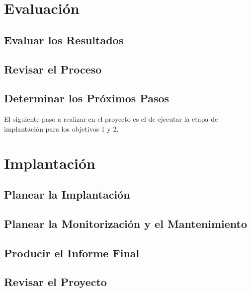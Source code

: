 \documentclass{article}
\begin{document}
\section{Evaluación}
\subsection{Evaluar los Resultados}
\subsection{Revisar el Proceso}
\subsection{Determinar los Próximos Pasos}
El siguiente paso a realizar en el proyecto es el de ejecutar la etapa de implantación para los objetivos 1 y 2.

\section{Implantación}
\subsection{Planear la Implantación}
\subsection{Planear la Monitorización y el Mantenimiento}
\subsection{Producir el Informe Final}
\subsection{Revisar el Proyecto}
\end{document}
